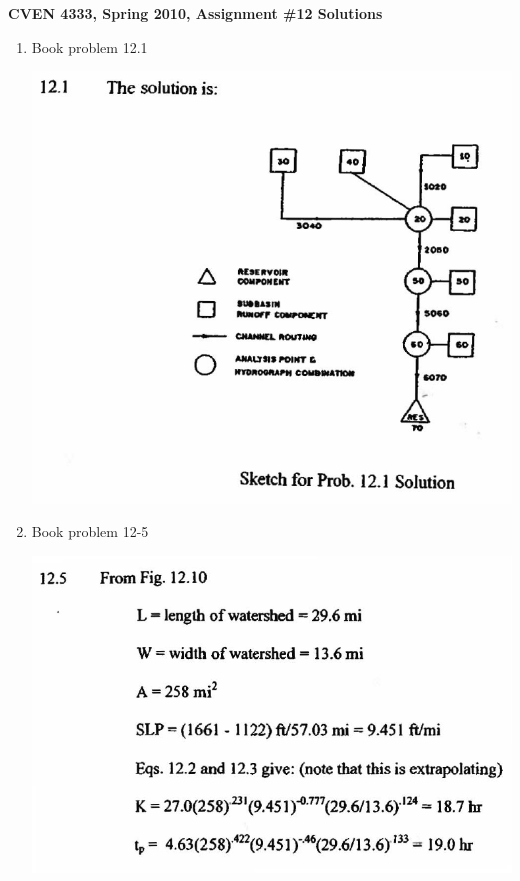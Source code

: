 \documentclass[11pt]{article}
\begin{document}
\textbf{CVEN 4333, Spring 2010, Assignment \#12 Solutions}

\begin{enumerate}

\item Book problem 12.1

\includegraphics{12-1.pdf}

\clearpage
\item Book problem 12-5

\includegraphics{12-5a.pdf}


\end{enumerate}
\end{document}

